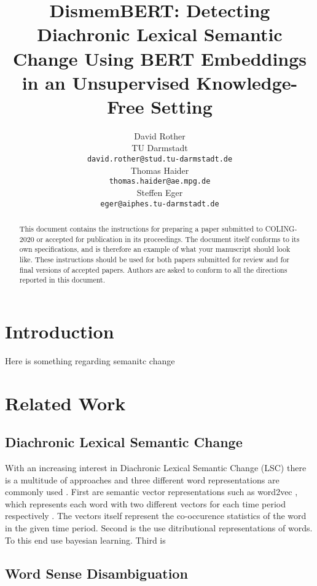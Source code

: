 \documentclass[11pt]{article}
\title{DismemBERT: Detecting Diachronic Lexical Semantic Change Using BERT Embeddings in an Unsupervised Knowledge-Free Setting}
\author{David Rother \\
  TU Darmstadt \\
  {\tt david.rother@stud.tu-darmstadt.de} \\\And
  Thomas Haider \\
  {\tt thomas.haider@ae.mpg.de} \\\And
  Steffen Eger \\
  {\tt eger@aiphes.tu-darmstadt.de} \\}
\date{}
\begin{document}
\maketitle
\begin{abstract}
  This document contains the instructions for preparing a paper submitted
  to COLING-2020 or accepted for publication in its proceedings. The document itself
  conforms to its own specifications, and is therefore an example of
  what your manuscript should look like. These instructions should be
  used for both papers submitted for review and for final versions of
  accepted papers. Authors are asked to conform to all the directions
  reported in this document.
\end{abstract}

\section{Introduction}
Here is something regarding semanitc change \cite{schlechtweg2018diachronic}

\section{Related Work}

\subsection{Diachronic Lexical Semantic Change}
With an increasing interest in Diachronic Lexical Semantic Change (LSC)  
there is a multitude of approaches and 
three different word representations are commonly used \cite{schlechtweg2019wind}. \newline
First are semantic vector representations such as word2vec \cite{mikolov2013efficient},
which represents each word with two different vectors for each time period respectively \cite{hamilton2016cultural,hamilton2016diachronic}.
The vectors itself represent the co-occurence statistics of the word in the given time period. \newline
Second is the use ditributional representations of words. To this end
\cite{frermann2016bayesian} use bayesian learning. \newline
Third is 

\subsection{Word Sense Disambiguation}
\end{document}
